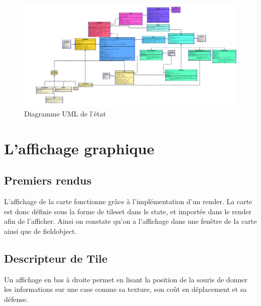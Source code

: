 \newpage

\clearpage

\begin{figure}[h]
    \centering
    \includegraphics[angle=270,origin=c,scale =0.5]{images/state.png}
    \caption{Diagramme UML de l'état}
    \label{fig:Advance Wars}
\end{figure}

\clearpage

\section{L'affichage graphique}

\subsection{Premiers rendus}
L'affichage de la carte fonctionne grâce à l'implémentation d'un render. La carte est donc définie sous la forme de tileset dans le state, et importée dans le render afin de l'afficher.
Ainsi on constate qu'on a l'affichage dans une fenêtre de la carte ainsi que de fieldobject. 

\subsection{Descripteur de Tile}

Un affichage en bas à droite permet en lisant la position de la souris de donner les informations sur une case comme sa texture, son coût en déplacement et sa défense.

